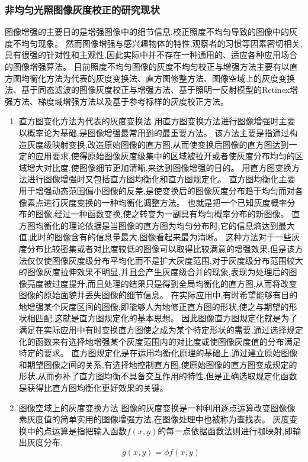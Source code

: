 \documentclass{amsart}
\begin{document}
\subsubsection{非均匀光照图像灰度校正的研究现状}
\label{sec:0205}
图像增强的主要目的是增强图像中的细节信息,校正照度不均匀导致的图像中的灰度不均匀现象。
然而图像增强与感兴趣物体的特性,观察者的习惯等因素密切相关,具有很强的针对性和主观性,因此实际中并不存在一种通用的、适应各种应用场合的图像增强算法。
目前照度不均匀图像的灰度不均匀校正与增强方法主要有以直方图均衡化方法为代表的灰度变换法、直方图修整方法、图像空域上的灰度变换法、基于同态滤波的图像灰度校正与增强方法、基于照明一反射模型的Retinex增强方法、梯度域增强方法以及基于参考标样的灰度校正方法。
\begin{enumerate}
\item 直方图变化方法为代表的灰度变换法
  用直方图变换方法进行图像增强时主要以概率论为基础,是图像增强最常用到的最重要方法。
  该方法主要是指通过构造灰度级映射变换,改造原始图像的直方图,从而使变换后图像的直方图达到一定的应用要求,使得原始图像灰度级集中的区域被拉开或者使灰度分布均匀的区域增大对比度,使图像细节更加清晰,来达到图像增强的目的。
  用直方图变换方法进行图像增强时又包括直方图均衡化和直方图规定化。
  直方图均衡化主要用于增强动态范围偏小图像的反差,是使变换后的图像灰度分布趋于均匀而对各像素点进行灰度变换的一种均衡化调整方法。
  也就是把一个已知灰度概率分布的图像,经过一种函数变换,使之转变为一副具有均匀概率分布的新图像。
  直方图均衡化的理论依据是当图像的直方图为均匀分布时,它的信息熵达到最大值,此时的图像含有的信息量最大,图像看起来最为清晰。
  这种方法对于一些灰度分布比较密集或者对比度较低的图像可以取得比较满意的增强效果,但是该方法仅仅使图像灰度级分布平均化而不是扩大灰度范围,对于灰度级分布范围较大的图像灰度拉伸效果不明显,并且会产生灰度级合并的现象,表现为处理后的图像亮度被过度提升,而且处理的结果只是得到全局均衡化的直方图,从而将改变图像的原始面貌并丢失图像的细节信息。
  在实际应用中,有时希望能够有目的地增强某个灰度区间的图像,即能够人为地修正直方图的形状,使之与期望的形状相匹配,这就是直方图规定化的基本思想。
  因此图像直方图规定化就是为了满足在实际应用中有时变换直方图使之成为某个特定形状的需要,通过选择规定化的函数来有选择地增强某个灰度范围内的对比度或使图像灰度值的分布满足特定的要求。
  直方图规定化是在运用均衡化原理的基础上,通过建立原始图像和期望图像之间的关系,有选择地控制直方图,使原始图像的直方图变成规定的形状,从而弥补了直方图均衡不具备交互作用的特性,但是正确选取规定化函数是获得比直方图均衡化更好效果的关键。
\item 图像空域上的灰度变换方法
  图像的灰度变换是一种利用逐点运算改变图像像素灰度值的简单实用的图像增强方法,在图像处理中也被称为查找表。
  灰度变换中的点运算是指把输入函数$f(x,y)$的每一点依据函数法则进行咖映射,即输出灰度分布.
  \begin{equation}
    \label{eq:20}
g(x,y)=\phi f(x,y)
\end{equation}


\end{enumerate}
\end{document}
